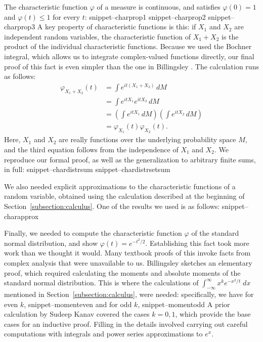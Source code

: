 \documentclass{svjour3}
\newcommand{\ph}{\varphi}
\newcommand{\Snippet}[1]{\csname snippet--#1\endcsname}
\begin{document}
The characteristic function $\ph$ of a measure is continuous, and satisfies $\ph(0) = 1$ and $\ph(t) \leq 1$ for every $t$:
\Snippet{charprop1}
\Snippet{charprop2}
\Snippet{charprop3}
A key property of characteristic functions is this: if $X_1$ and $X_2$ are independent random variables, the characteristic function of $X_1 + X_2$ is the product of the individual characteristic functions. Because we used the Bochner integral, which allows us to integrate complex-valued functions directly, our final proof of this fact is even simpler than the one in Billingsley \cite{billingsley:95}. The calculation runs as follows:
\begin{align*}
\ph_{X_1 + X_2}(t) &= \int e^{i t (X_1 + X_2)} \, dM  \\
                   &= \int e^{i t X_1} e^{i t X_2} \, dM \\
                   &= \left(\int e^{i t X_1} \, dM\right) \left(\int e^{i t X_2} \, dM\right) \\
                   &= \ph_{X_1}(t) \ph_{X_2}(t).
\end{align*}
Here, $X_1$ and $X_2$ are really functions over the underlying probability space $M$, and the third equation follows from the independence of $X_1$ and $X_2$. We reproduce our formal proof, as well as the generalization to arbitrary finite sums, in full:
\Snippet{chardistrsum}
\Snippet{chardistrsetsum}

We also needed explicit approximations to the characteristic functions of a random variable, obtained using the calculation described at the beginning of Section~\ref{subsection:calculus}. One of the results we used is as follows:
\Snippet{charapprox}

Finally, we needed to compute the characteristic function $\ph$ of the standard normal distribution, and show $\ph(t) = e^{-t^2/2}$. Establishing this fact took more work than we thought it would. Many textbook proofs of this invoke facts from complex analysis that were unavailable to us. Billingsley \cite[page 344]{billingsley:95} sketches an elementary proof, which required calculating the moments and absolute moments of the standard normal distribution. This is where the calculations of $\int_{-\infty}^\infty x^k e^{-x^2 / t} \; dx$ mentioned in Section~\ref{subsection:calculus}, were needed: specifically, we have for even $k$, 
\Snippet{momenteven}
and for odd $k$,
\Snippet{momentodd}
A prior calculation by Sudeep Kanav covered the cases $k = 0, 1$, which provide the base cases for an inductive proof. Filling in the details involved carrying out careful computations with integrals and power series approximations to $e^x$.
\end{document}
